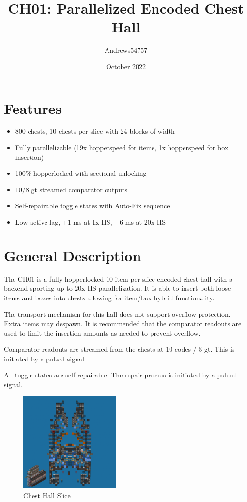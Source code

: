 \documentclass[10pt]{datasheet}
\title{CH01: Parallelized Encoded Chest Hall}
\author{Andrews54757}
\date{October 2022}
\begin{document}
\maketitle

\section{Features}

\begin{itemize}
\item{800 chests, 10 chests per slice with 24 blocks of width}
\item{Fully parallelizable (19x hopperspeed for items, 1x hopperspeed for box insertion)}
\item{100\% hopperlocked with sectional unlocking}
\item{10/8 gt streamed comparator outputs}
\item{Self-repairable toggle states with Auto-Fix sequence}
\item{Low active lag, +1 ms at 1x HS, +6 ms at 20x HS}
\end{itemize}

\section{General Description}
The CH01 is a fully hopperlocked 10 item per slice encoded chest hall with a backend sporting up to 20x HS parallelization. It is able to insert both loose items and boxes into chests allowing for item/box hybrid functionality.

The transport mechanism for this hall does not support overflow protection. Extra items may despawn. It is recommended that the comparator readouts are used to limit the insertion amounts as needed to prevent overflow.

Comparator readouts are streamed from the chests at 10 codes / 8 gt. This is initiated by a pulsed signal.

All toggle states are self-repairable. The repair process is initiated by a pulsed signal.
\vfill\break

\begin{figure}[h]
    \includegraphics[width=0.45\textwidth]{chesthall.png}
    \caption{Chest Hall Slice}
\end{figure}
\end{document}
